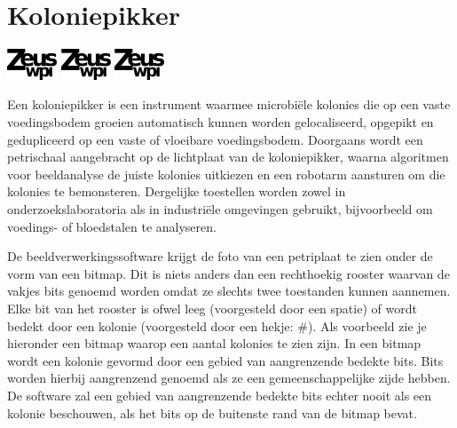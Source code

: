 
\section*{Koloniepikker}
\flushright
\includegraphics[width=4em]{logo-new.png}
\includegraphics[width=4em]{logo-new.png}
\includegraphics[width=4em]{logo-new.png}
\flushleft

Een koloniepikker is een instrument waarmee microbi\"ele kolonies die op een
vaste voedingsbodem groeien automatisch kunnen worden gelocaliseerd, opgepikt
en gedupliceerd op een vaste of vloeibare voedingsbodem. Doorgaans wordt een
petrischaal aangebracht op de lichtplaat van de koloniepikker, waarna
algoritmen voor beeldanalyse de juiste kolonies uitkiezen en een robotarm
aansturen om die kolonies te bemonsteren. Dergelijke toestellen worden zowel in
onderzoekslaboratoria als in industri\"ele omgevingen gebruikt, bijvoorbeeld om
voedings- of bloedstalen te analyseren.

De beeldverwerkingssoftware krijgt de foto van een petriplaat te zien onder de
vorm van een bitmap. Dit is niets anders dan een rechthoekig rooster waarvan de
vakjes bits genoemd worden omdat ze slechts twee toestanden kunnen aannemen.
Elke bit van het rooster is ofwel leeg (voorgesteld door een spatie) of wordt
bedekt door een kolonie (voorgesteld door een hekje: \#). Als voorbeeld zie je
hieronder een bitmap waarop een aantal kolonies te zien zijn. In een bitmap
wordt een kolonie gevormd door een gebied van aangrenzende bedekte bits. Bits
worden hierbij aangrenzend genoemd als ze een gemeenschappelijke zijde hebben.
De software zal een gebied van aangrenzende bedekte bits echter nooit als een
kolonie beschouwen, als het bits op de buitenste rand van de bitmap bevat.

